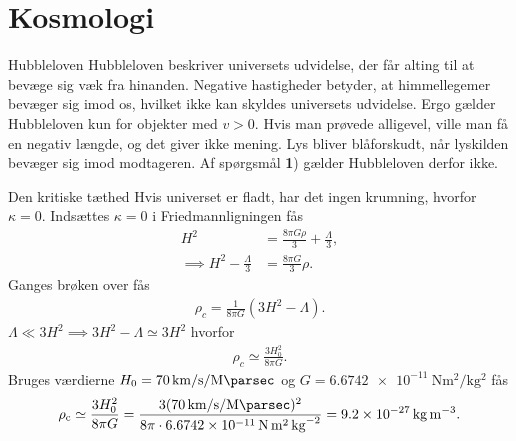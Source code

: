 \documentclass[crop=false, class=memoir]{standalone}
\begin{document}
\chapter{Kosmologi} \label{chap:kosmo_facit}

\begin{opgave}{Hubbleloven}
    \opg Hubbleloven beskriver universets udvidelse, der får alting til at bevæge sig væk fra hinanden. Negative hastigheder betyder, at himmellegemer bevæger sig imod os, hvilket ikke kan skyldes universets udvidelse. Ergo gælder Hubbleloven kun for objekter med $v > 0$. Hvis man prøvede alligevel, ville man få en negativ længde, og det giver ikke mening.
    \opg Lys bliver blåforskudt, når lyskilden bevæger sig imod modtageren. Af spørgsmål \textbf{1}) gælder Hubbleloven derfor ikke.
\end{opgave}

\begin{opgave}{Den kritiske tæthed}
\opg Hvis universet er fladt, har det ingen krumning, hvorfor $\kappa = 0$.
\opg Indsættes $\kappa = 0$ i Friedmannligningen fås
%
\begin{align*}
    H^2 &= \frac{8\pi G \rho}{3} + \frac{\Lambda}{3}, \\
    \implies H^2 - \frac{\Lambda}{3} &= \frac{8\pi G}{3}\rho.
\end{align*}
%
Ganges brøken over fås
%
\begin{align*}
    \rho_c = \frac{1}{8\pi G}\left(3H^2 - \Lambda\right).
\end{align*}
%
\opg $\Lambda \ll 3H^2 \implies 3H^2 - \Lambda \simeq 3H^2$ hvorfor
%
\begin{align*}
    \rho_c \simeq \frac{3H_0^2}{8\pi G}.
\end{align*}
%
\opg Bruges værdierne $H_0 = \SI{70}{\kilo\metre\per\second\per\mega\parsec}$ og $G = \SI{6,6742e-11}{\newton\metre\squared\per\kilo\gram\squared}$ fås
%
\begin{align*}
    \rho_\text{c} \simeq \frac{3H_0^2}{8\pi G} = \frac{3(\SI{70}{\kilo\metre\per\second\per\mega\parsec})^2}{8\pi\cdot\SI{6,6742e-11}{\newton\square\metre\per\square\kilo\gram}} =  \SI{9.2e-27}{\kilo\gram\per\cubic\metre}.
\end{align*}
\end{opgave}
\end{document}
